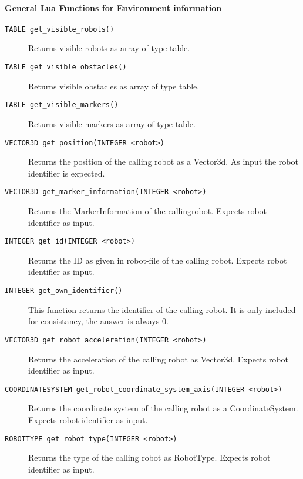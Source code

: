 \paragraph{General Lua Functions for Environment information}

\begin{description}
	\item [\texttt{TABLE get\_visible\_robots()}] 
		Returns visible robots as array of type table.
		
	\item [\texttt{TABLE get\_visible\_obstacles()}] 
		Returns visible obstacles as array of type table.
		
	\item [\texttt{TABLE get\_visible\_markers()}] 
		Returns visible markers as array of type table.
		
	\item [\texttt{VECTOR3D get\_position(INTEGER <robot>)}] 
		Returns the position of the calling robot as a Vector3d. As input the robot identifier is expected.
		
	\item [\texttt{VECTOR3D get\_marker\_information(INTEGER <robot>)}] 
		Returns the MarkerInformation of the calling\linebreak robot. Expects robot identifier as input.
		
	\item [\texttt{INTEGER get\_id(INTEGER <robot>)}] 
		Returns the ID as given in robot-file of the calling robot. Expects robot identifier as input.
		
	\item [\texttt{INTEGER get\_own\_identifier()}]
		This function returns the identifier of the calling robot. It is only included for consistancy, the answer is always $0$.
		
	\item [\texttt{VECTOR3D get\_robot\_acceleration(INTEGER <robot>)}] 
		Returns the acceleration of the calling robot as Vector3d. Expects robot identifier as input.
		
	\item [\texttt{COORDINATESYSTEM get\_robot\_coordinate\_system\_axis(INTEGER <robot>)}] 
		Returns the coordinate system of the calling robot as a CoordinateSystem. Expects robot identifier as input.
		
	\item [\texttt{ROBOTTYPE get\_robot\_type(INTEGER <robot>)}] 
		Returns the type of the calling robot as RobotType. Expects robot identifier as input.
		

\end{description}
